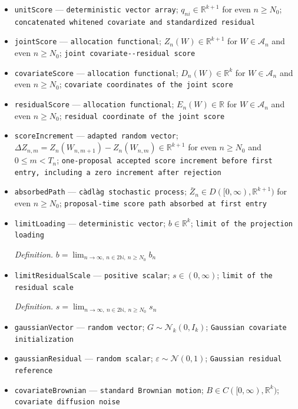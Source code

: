 \documentclass{article}
\begin{document}
\begin{itemize}
  \item \texttt{unitScore} --- \texttt{deterministic vector array}; \(q_{ni}\in\mathbb R^{k+1}\) for even \(n\ge N_0\); \texttt{concatenated whitened covariate and standardized residual}
  \item \texttt{jointScore} --- \texttt{allocation functional}; \(Z_n(W)\in\mathbb R^{k+1}\) for \(W\in\mathcal A_n\) and even \(n\ge N_0\); \texttt{joint covariate-\allowbreak{}-\allowbreak{}residual score}
  \item \texttt{covariateScore} --- \texttt{allocation functional}; \(D_n(W)\in\mathbb R^k\) for \(W\in\mathcal A_n\) and even \(n\ge N_0\); \texttt{covariate coordinates of the joint score}
  \item \texttt{residualScore} --- \texttt{allocation functional}; \(E_n(W)\in\mathbb R\) for \(W\in\mathcal A_n\) and even \(n\ge N_0\); \texttt{residual coordinate of the joint score}
  \item \texttt{scoreIncrement} --- \texttt{adapted random vector}; \(\Delta Z_{n,m}=Z_n(W_{n,m+1})-Z_n(W_{n,m})\in\mathbb R^{k+1}\) for even \(n\ge N_0\) and \(0\le m<T_n\); \texttt{one-\allowbreak{}proposal accepted score increment before first entry,\allowbreak{} including a zero increment after rejection}
  \item \texttt{absorbedPath} --- \texttt{càdlàg stochastic process}; \(\bar Z_n\in D([0,\infty),\mathbb R^{k+1})\) for even \(n\ge N_0\); \texttt{proposal-\allowbreak{}time score path absorbed at first entry}
  \item \texttt{limitLoading} --- \texttt{deterministic vector}; \(b\in\mathbb R^k\); \texttt{limit of the projection loading}
  \par\smallskip\noindent\emph{Definition.} \(b=\lim_{n\to\infty,\ n\in2\mathbb N,\ n\ge N_0}b_n\)
  \item \texttt{limitResidualScale} --- \texttt{positive scalar}; \(s\in(0,\infty)\); \texttt{limit of the residual scale}
  \par\smallskip\noindent\emph{Definition.} \(s=\lim_{n\to\infty,\ n\in2\mathbb N,\ n\ge N_0}s_n\)
  \item \texttt{gaussianVector} --- \texttt{random vector}; \(G\sim\mathcal N_k(0,I_k)\); \texttt{Gaussian covariate initialization}
  \item \texttt{gaussianResidual} --- \texttt{random scalar}; \(\varepsilon\sim\mathcal N(0,1)\); \texttt{Gaussian residual reference}
  \item \texttt{covariateBrownian} --- \texttt{standard Brownian motion}; \(B\in C([0,\infty),\mathbb R^k)\); \texttt{covariate diffusion noise}

\end{itemize}
\end{document}

